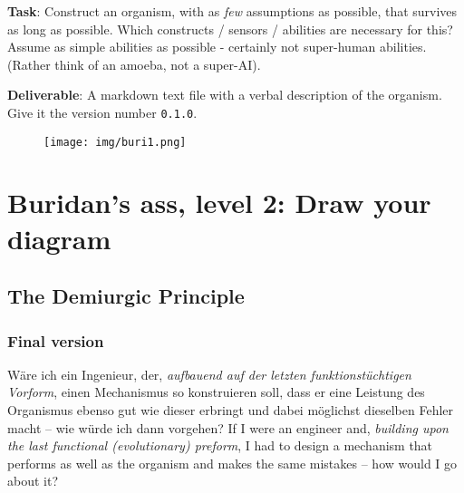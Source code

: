 \documentclass[
  letterpaper,
  DIV=11,
  numbers=noendperiod]{scrartcl}
\begin{document}
\textbf{Task}: Construct an organism, with as \emph{few} assumptions as
possible, that survives as long as possible. Which constructs / sensors
/ abilities are necessary for this? Assume as simple abilities as
possible - certainly not super-human abilities. (Rather think of an
amoeba, not a super-AI).

\textbf{Deliverable}: A markdown text file with a verbal description of
the organism. Give it the version number \texttt{0.1.0}.

\begin{figure}

{\centering \texttt{[image: img/buri1.png]}

}

\end{figure}

\hypertarget{buridans-ass-level-2-draw-your-diagram}{%
\section{Buridan's ass, level 2: Draw your
diagram}\label{buridans-ass-level-2-draw-your-diagram}}

\hypertarget{the-demiurgic-principle-1}{%
\subsection{The Demiurgic Principle}\label{the-demiurgic-principle-1}}

\hypertarget{final-version}{%
\subsubsection{Final version}\label{final-version}}

\begin{tcolorbox}[enhanced jigsaw, coltitle=black, opacityback=0, toprule=.15mm, colback=white, colframe=quarto-callout-note-color-frame, bottomtitle=1mm, breakable, leftrule=.75mm, left=2mm, opacitybacktitle=0.6, title=\textcolor{quarto-callout-note-color}{\faInfo}\hspace{0.5em}{Note}, bottomrule=.15mm, toptitle=1mm, titlerule=0mm, colbacktitle=quarto-callout-note-color!10!white, rightrule=.15mm, arc=.35mm]

Wäre ich ein Ingenieur, der, \emph{aufbauend auf der letzten
funktionstüchtigen Vorform}, einen Mechanismus so konstruieren soll,
dass er eine Leistung des Organismus ebenso gut wie dieser erbringt und
dabei möglichst dieselben Fehler macht -- wie würde ich dann vorgehen?
{If I were an engineer and, \emph{building upon the last functional
(evolutionary) preform}, I had to design a mechanism that performs as
well as the organism and makes the same mistakes -- how would I go about
it?}

\end{tcolorbox}
\end{document}

